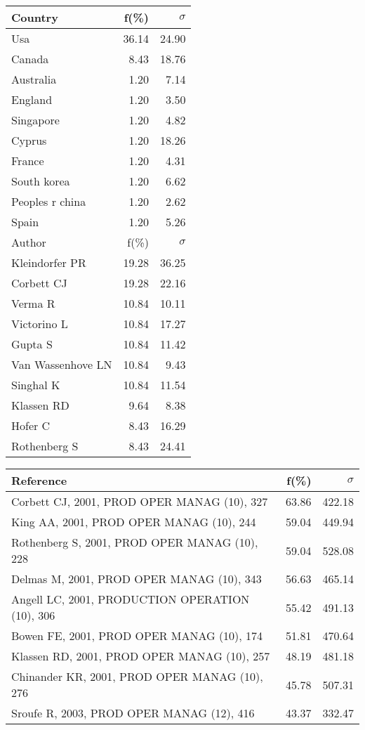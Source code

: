 \documentclass[a4paper,11pt]{report}
\begin{document}
\begin{landscape}
\begin{table}[!ht]
{\begin{tabular}{|l r r|}
\hline
\hline
Country & f(\%) & $\sigma$\\
\hline
Usa & 36.14 & 24.90\\
Canada & 8.43 & 18.76\\
Australia & 1.20 & 7.14\\
England & 1.20 & 3.50\\
Singapore & 1.20 & 4.82\\
Cyprus & 1.20 & 18.26\\
France & 1.20 & 4.31\\
South korea & 1.20 & 6.62\\
Peoples r china & 1.20 & 2.62\\
Spain & 1.20 & 5.26\\
\hline
\hline
Author & f(\%) & $\sigma$\\
\hline
Kleindorfer PR & 19.28 & 36.25\\
Corbett CJ & 19.28 & 22.16\\
Verma R & 10.84 & 10.11\\
Victorino L & 10.84 & 17.27\\
Gupta S & 10.84 & 11.42\\
Van Wassenhove LN & 10.84 & 9.43\\
Singhal K & 10.84 & 11.54\\
Klassen RD & 9.64 & 8.38\\
Hofer C & 8.43 & 16.29\\
Rothenberg S & 8.43 & 24.41\\
\hline
\end{tabular}
}
{\scriptsize\begin{tabular}{|l r r|}
\hline
Reference & f(\%) & $\sigma$\\
\hline
Corbett CJ, 2001, PROD OPER MANAG (10), 327 & 63.86 & 422.18\\
King AA, 2001, PROD OPER MANAG (10), 244 & 59.04 & 449.94\\
Rothenberg S, 2001, PROD OPER MANAG (10), 228 & 59.04 & 528.08\\
Delmas M, 2001, PROD OPER MANAG (10), 343 & 56.63 & 465.14\\
Angell LC, 2001, PRODUCTION OPERATION (10), 306 & 55.42 & 491.13\\
Bowen FE, 2001, PROD OPER MANAG (10), 174 & 51.81 & 470.64\\
Klassen RD, 2001, PROD OPER MANAG (10), 257 & 48.19 & 481.18\\
Chinander KR, 2001, PROD OPER MANAG (10), 276 & 45.78 & 507.31\\
Sroufe R, 2003, PROD OPER MANAG (12), 416 & 43.37 & 332.47\\

\end{tabular}}
\end{table}
\end{landscape}
\end{document}
